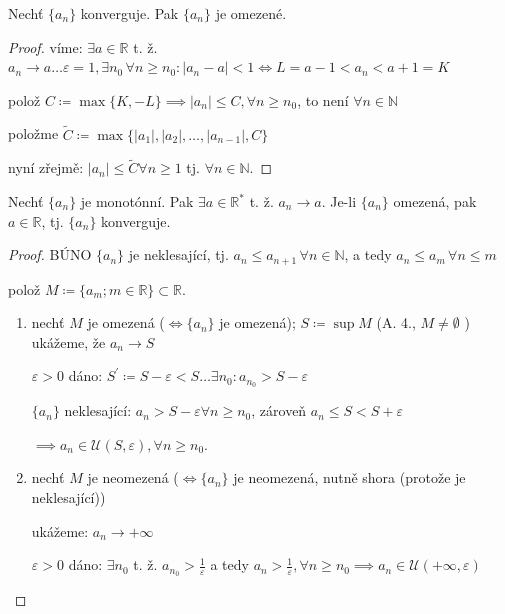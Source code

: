 \begin{veta}
  Nechť $\{a_n\}$ konverguje. Pak $\{a_n\}$ je omezené.
\end{veta}

\begin{proof}
  víme: $\exists a \in \mathbb R$ t. ž. $a_n \to a \dots \varepsilon =1, \exists n_0 \,\forall n \geq n_0: |a_n-a|<1 \iff L = a-1 < a_n < a+1 = K$

  polož $C \coloneq \max\{K, -L\} \implies |a_n|\leq C, \forall n \geq n_0$, to není $\forall n \in \mathbb N$

  položme $\tilde{C} \coloneq \max \{|a_1|, |a_2|, \dots, |a_{n-1}|, C\}$

  nyní zřejmě: $|a_n| \leq \tilde C \forall n \geq 1$ tj. $\forall n \in \mathbb N$.
\end{proof}

\begin{veta}
  Nechť $\{a_n\}$ je monotónní. Pak $\exists a \in \mathbb R^*$ t. ž. $a_n \to a$. Je-li $\{a_n\}$ omezená, pak $a\in \mathbb R$, tj. $\{a_n\}$ konverguje.
\end{veta}

\begin{proof}
  BÚNO $\{a_n\}$ je neklesající, tj. $a_n \leq a_{n+1} \,\forall n \in \mathbb N$, a tedy $a_n \leq a_m \,\forall n \leq m$

  polož $M \coloneq \{a_m; m \in \mathbb R\} \subset \mathbb R$.
  \begin{enumerate}[1.]
    \item nechť $M$ je omezená ($\iff \{ a_n \}$ je omezená); $S \coloneq \sup M$ (A. 4., $M \neq \emptyset $ )
          ukážeme, že $a_n \to S$

          $\varepsilon >0$ dáno: $S^\prime \coloneq S - \varepsilon < S \dots \exists n_0: a_{n_0}>S-\varepsilon$

          $\{a_n\}$ neklesající: $a_n > S - \varepsilon \forall n \geq n_0$, zároveň $a_n \leq S < S + \varepsilon$

          $\implies a_n \in \mathscr U(S, \varepsilon), \forall n \geq n_0$.
          \item nechť $M$ je neomezená ($\iff \{a_n\}$ je neomezená, nutně shora (protože je neklesající))

          ukážeme: $a_n \to +\infty$

          $\varepsilon >0$ dáno: $\exists n_0$ t. ž. $a_{n_0} > \frac{1}{\varepsilon}$ a tedy $a_n > \frac{1}{\varepsilon}, \forall n \geq n_0 \implies a_n \in \mathscr U(+\infty, \varepsilon)$
  \end{enumerate}
\end{proof}

